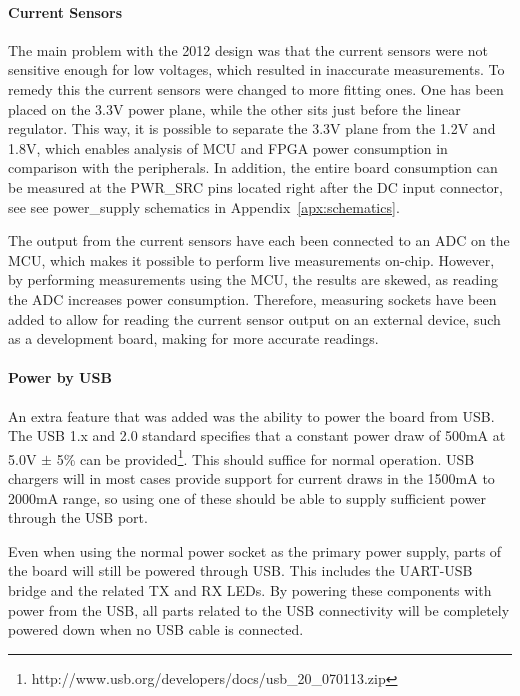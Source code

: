 \paragraph{Current Sensors} \label{psu:current_sensors}

The main problem with the 2012 design was that the current sensors were not
sensitive enough for low voltages, which resulted in inaccurate measurements. To
remedy this the current sensors were changed to more fitting ones. One has been
placed on the 3.3V power plane, while the other sits just before the linear
regulator. This way, it is possible to separate the 3.3V plane from the 1.2V and
1.8V, which enables analysis of MCU and FPGA power consumption in comparison
with the peripherals. In addition, the entire board consumption can be measured
at the PWR\_SRC pins located right after the DC input connector, see
see power\_supply schematics in Appendix~\ref{apx:schematics}.

The output from the current sensors have each been connected to an ADC on the
MCU, which makes it possible to perform live measurements on-chip. However, by
performing measurements using the MCU, the results are skewed, as reading the
ADC increases power consumption. Therefore, measuring sockets have been added to
allow for reading the current sensor output on an external device, such as a
development board, making for more accurate readings.

\paragraph{Power by USB} \label{psu:usb}

An extra feature that was added was the ability to power the board from USB. The
USB 1.x and 2.0 standard specifies that a constant power draw of 500mA at 5.0V
$\pm$ 5\% can be provided\footnote{
http://www.usb.org/developers/docs/usb\_20\_070113.zip}. This should suffice for
normal operation. USB chargers will in most cases provide support for current
draws in the 1500mA to 2000mA range, so using one of these should be able to
supply sufficient power through the USB port.

Even when using the normal power socket as the primary power supply, parts of
the board will still be powered through USB. This includes the UART-USB bridge
and the related TX and RX LEDs. By powering these components with power from the
USB, all parts related to the USB connectivity will be completely powered down
when no USB cable is connected.

